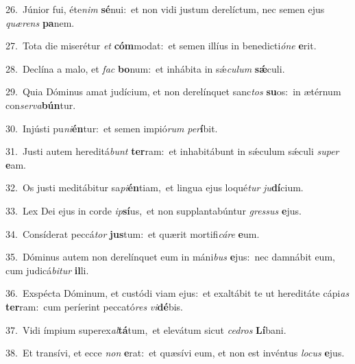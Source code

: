 {\numbfont\textcolor{\numbcolor}{26.}}~Júnior fui, éte\textit{nim} \textbf{sé}\-nui:~\star et non vidi justum derelíctum, nec semen ejus \textit{quæ}\-\textit{rens} \textbf{pa}\-nem.\par
{\numbfont\textcolor{\numbcolor}{27.}}~Tota die miserétur \textit{et} \textbf{cóm}\-modat:~\star et semen illíus in benedicti\-\textit{ó}\-\textit{ne} \textbf{e}\-rit.\par
{\numbfont\textcolor{\numbcolor}{28.}}~Declína a malo, et \textit{fac} \textbf{bo}\-num:~\star et inhábita in sǽ\-\textit{cu}\-\textit{lum} \textbf{sǽ}\-culi.\par
{\numbfont\textcolor{\numbcolor}{29.}}~Quia Dóminus amat judícium, et non derelínquet sanc\textit{tos} \textbf{su}\-os:~\star in ætérnum con\-\textit{ser}\-\textit{va}\textbf{bún}tur.\par
{\numbfont\textcolor{\numbcolor}{30.}}~Injústi pu\-\textit{ni}\-\textbf{én}tur:~\star et semen impió\textit{rum} \textit{per}\-\textbf{í}bit.\par
{\numbfont\textcolor{\numbcolor}{31.}}~Justi autem hereditá\textit{bunt} \textbf{ter}\-ram:~\star et inhabitábunt in sǽculum sǽculi \textit{su}\-\textit{per} \textbf{e}\-am.\par
{\numbfont\textcolor{\numbcolor}{32.}}~Os justi meditábitur sa\-\textit{pi}\-\textbf{én}tiam,~\star et lingua ejus loqué\textit{tur} \textit{ju}\-\textbf{dí}cium.\par
{\numbfont\textcolor{\numbcolor}{33.}}~Lex Dei ejus in corde \textit{ip}\-\textbf{sí}us,~\star et non supplantabúntur \textit{gres}\-\textit{sus} \textbf{e}\-jus.\par
{\numbfont\textcolor{\numbcolor}{34.}}~Consíderat peccá\textit{tor} \textbf{jus}\-tum:~\star et quærit mortifi\-\textit{cá}\-\textit{re} \textbf{e}\-um.\par
{\numbfont\textcolor{\numbcolor}{35.}}~Dóminus autem non derelínquet eum in máni\textit{bus} \textbf{e}\-jus:~\star nec damnábit eum, cum judicá\-\textit{bi}\-\textit{tur} \textbf{il}\-li.\par
{\numbfont\textcolor{\numbcolor}{36.}}~Exspécta Dóminum, et custódi viam ejus:~\dagger et exaltábit te ut hereditáte cápi\textit{as} \textbf{ter}\-ram:~\star cum períerint peccató\textit{res} \textit{vi}\-\textbf{dé}bis.\par
{\numbfont\textcolor{\numbcolor}{37.}}~Vidi ímpium superex\-\textit{al}\-\textbf{tá}tum,~\star et elevátum sicut \textit{ce}\-\textit{dros} \textbf{Lí}\-bani.\par
{\numbfont\textcolor{\numbcolor}{38.}}~Et transívi, et ecce \textit{non} \textbf{e}\-rat:~\star et quæsívi eum, et non est invéntus \textit{lo}\-\textit{cus} \textbf{e}\-jus.\par
